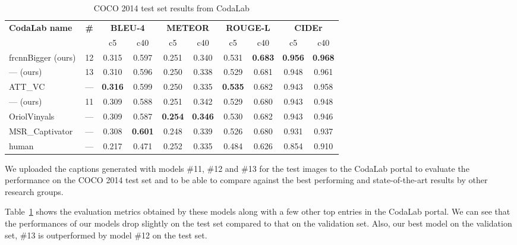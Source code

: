 \begin{table}[htp]
  \newcommand{\mct}[1]{%
    \multicolumn{2}{c|}{\bf#1}}
  \centering
  \caption{COCO 2014 test set results from CodaLab}
  \begin{adjustbox}{center}
  \begin{tabular}{||l|c|c|c|c|c|c|c|c|c||}
    \hline\hline
    \multirow{2}{*}{\bf CodaLab name}&\multirow{2}{*}{\bf\#}
                       &\mct{BLEU-4} &\mct{METEOR} &\mct{ROUGE-L}&\mct{CIDEr}\\\cline{3-10}
                &     & c5    & c40   &  c5   & c40   & c5  &  c40  &  c5  &  c40 \\\hline\hline
    frcnnBigger (ours)& 12    & 0.315 & 0.597 & 0.251 &0.340& 0.531 &\bf0.683&\bf0.956&\bf0.968\\
    --- (ours)        & 13    & 0.310 & 0.596 & 0.250 &0.338& 0.529 & 0.681& 0.948& 0.961\\
    ATT\_VC~\cite{you2016image}& ---   &\bf0.316&0.599 & 0.250 &0.335&\bf0.535&0.682& 0.943& 0.958\\
    --- (ours)        & 11    & 0.309 & 0.588 & 0.251 &0.342& 0.529 & 0.680& 0.943& 0.948\\
    OriolVinyals~\cite{Vinyals_2015_CVPR}      & ---   & 0.309 & 0.587 &\bf0.254&\bf0.346& 0.530 & 0.682& 0.943& 0.946\\
    MSR\_Captivator~\cite{Fang2015} & ---   & 0.308 &\bf0.601& 0.248 &0.339& 0.526 & 0.680& 0.931& 0.937\\
    human~\cite{Chen2015}& ---   & 0.217 & 0.471 & 0.252 &0.335& 0.484 & 0.626 & 0.854 & 0.910\\\hline
    \hline
  \end{tabular}
  \end{adjustbox}
  \label{tab:resultsTest}
\end{table}

We uploaded the captions generated with models \#11, \#12 and \#13 for the test
images to the CodaLab portal to evaluate the performance on the COCO 2014 test
set and to be able to compare against the best performing and state-of-the-art
results by other research groups.

Table~\ref{tab:resultsTest} shows the evaluation metrics obtained by these
models along with a few other top entries in the CodaLab portal. 
We can see that the performances of our models drop slightly on the test set
compared to that on the validation set. 
Also, our best model on the validation set, \#13 is outperformed by model \#12
on the test set.

